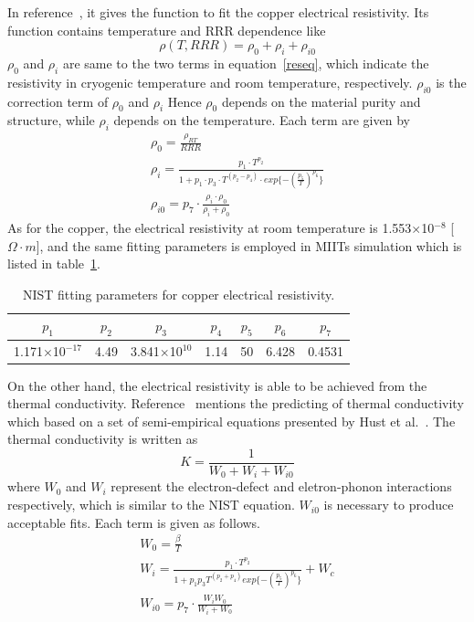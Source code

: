 In reference~\cite{nist}, it gives the function to fit the copper electrical resistivity.
Its function contains temperature and RRR dependence like
\begin{equation}
 \rho (T, RRR) = \rho_0 + \rho_i + \rho_{i0}
\end{equation}
$\rho_0$ and $\rho_i$ are same to the two terms in equation~\ref{reseq}, which indicate the resistivity in cryogenic temperature and room temperature, respectively.
$\rho_{i0}$ is the correction term of $\rho_0$ and $\rho_i$
Hence $\rho_0$ depends on the material purity and structure, while $\rho_i$ depends on the temperature.
Each term are given by
\begin{gather}
 \rho_0 = \frac{\rho_{RT}}{RRR} \\
 \rho_i = \frac{p_1 \cdot T^{p_2}}{1 + p_1 \cdot p_3 \cdot T^{(p_2-p_4)} \cdot exp\{-(\frac{p_5}{T})^{p_6}\}} \\
 \rho_{i0} = p_7 \cdot \frac{\rho_i \cdot \rho_0}{\rho_i + \rho_0}
\end{gather}
As for the copper, the electrical resistivity at room temperature is 1.553$\times$10$^{-8}$ [$\Omega\cdot m$], and the same fitting parameters is employed in MIITs simulation which is listed in table~\ref{cures}.
\begin{table}[H]
 \centering
 \begin{tabular}{ccccccc} \hline \hline
  $p_1$ & $p_2$ & $p_3$ & $p_4$ & $p_5$ & $p_6$ & $p_7$ \\ \hline
  1.171$\times$10$^{-17}$ & 4.49 & 3.841$\times$10$^{10}$ & 1.14 & 50 & 6.428 & 0.4531 \\ \hline \hline
 \end{tabular}
 \caption{NIST fitting parameters for copper electrical resistivity.}
 \label{cures}
\end{table}
On the other hand, the electrical resistivity is able to be achieved from the thermal conductivity.
Reference~\cite{wood} mentions the predicting of thermal conductivity which based on a set of semi-empirical equations presented by Hust et al.~\cite{hust}.
The thermal conductivity is written as
\begin{equation}
 K = \frac{1}{W_0 + W_i + W_{i0}}
\end{equation}
where $W_0$ and $W_i$ represent the electron-defect and eletron-phonon interactions respectively, which is similar to the NIST equation.
$W_{i0}$ is necessary to produce acceptable fits.
Each term is given as follows.
\begin{gather}
 W_0 = \frac{\beta}{T} \\
 W_i = \frac{p_1 \cdot T^{p_2}}{1 + p_1p_3T^{(p_2+p_4)}exp\{-(\frac{p_5}{T})^{p_6}\}} + W_c \\
 W_{i0} = p_7 \cdot \frac{W_i W_0}{W_i + W_0}
\end{gather}

